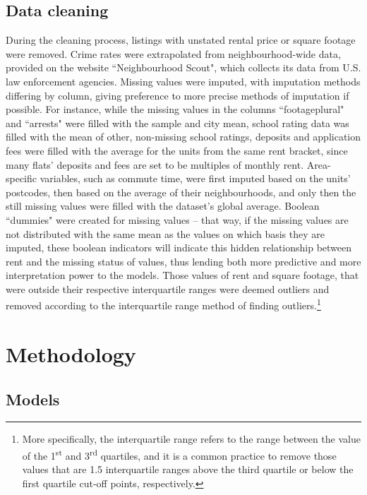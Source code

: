 \documentclass[12pt]{report}
\begin{document}
\subsection{Data cleaning}
During the cleaning process, listings with unstated rental price or square footage were removed. Crime rates were extrapolated from neighbourhood-wide data, provided on the website ``Neighbourhood Scout", which collects its data from U.S. law enforcement agencies. Missing values were imputed, with imputation methods differing by column, giving preference to more precise methods of imputation if possible. For instance, while the missing values in the columns ``footageplural" and ``arrests" were filled with the sample and city mean, school rating data was filled with the mean of other, non-missing school ratings, deposits and application fees were filled with the average for the units from the same rent bracket, since many flats' deposits and fees are set to be multiples of monthly rent. Area-specific variables, such as commute time, were first imputed based on the units' postcodes, then based on the average of their neighbourhoods, and only then the still missing values were filled with the dataset's global average. Boolean ``dummies" were created for missing values -- that way, if the missing values are not distributed with the same mean as the values on which basis they are imputed, these boolean indicators will indicate this hidden relationship between rent and the missing status of values, thus lending both more predictive and more interpretation power to the models.
Those values of rent and square footage, that were outside their respective interquartile ranges were deemed outliers and removed according to the interquartile range method of finding outliers.\footnote{More specifically, the interquartile range refers to the range between the value of the 1\textsuperscript{st} and 3\textsuperscript{rd} quartiles, and it is a common practice to remove those values that are 1.5 interquartile ranges above the third quartile or below the first quartile cut-off points, respectively.}

\section{Methodology}
\subsection{Models}
\end{document}
